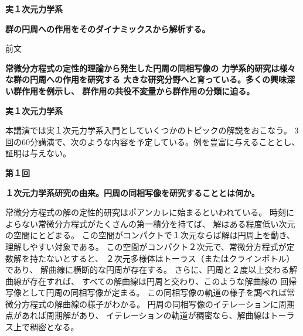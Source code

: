 \documentclass[uplatex,dvipdfmx]{jlreq}
\begin{document}
\begin{center}
  \vspace*{20pt}
  {\Huge\bfseries 実１次元力学系}

  \vspace{30pt}

  {\Large\bfseries 群の円周への作用をそのダイナミックスから解析する。}

  \vspace{50pt}

  {\large 前文}

  \vspace{10pt}

  \parbox{0.85\textwidth}{
    \large\bfseries
    常微分方程式の定性的理論から発生した円周の同相写像の
    力学系的研究は様々な群の円周への作用を研究する
    大きな研究分野へと育っている。多くの興味深い群作用を例示し、
    群作用の共役不変量から群作用の分類に迫る。
  }
\end{center}

\vfill

\newpage

\begin{center}
{\large\bfseries 実１次元力学系}

\hspace*{\fill}{\large\bfseries 坪井　俊（東大数理）}
\end{center}

\smallskip

本講演では実１次元力学系入門としていくつかのトピックの解説をおこなう。
3回の60分講演で、次のような内容を予定している。例を豊富に与えることとし、証明は与えない。

\bigskip
\noindent
{\large\textbf{第１回}}

\medskip
\noindent
\textbf{１次元力学系研究の由来。円周の同相写像を研究することとは何か。}

\medskip

常微分方程式の解の定性的研究はポアンカレに始まるといわれている。
時刻によらない常微分方程式がたくさんの第一積分を持てば、
解はある程度低い次元の空間にとどまる。
この空間がコンパクトで１次元ならば解は円周上を動き、理解しやすい対象である。
この空間がコンパクト２次元で、常微分方程式が定数解を持たないとすると、
２次元多様体はトーラス（またはクラインボトル）であり、
解曲線に横断的な円周が存在する。
さらに、円周と２度以上交わる解曲線が存在すれば、
すべての解曲線は円周と交わり、このような解曲線の
回帰写像として円周の同相写像が定まる。
この同相写像の軌道の様子を調べれば常微分方程式の解曲線の様子がわかる。
円周の同相写像のイテレーションに周期点があれば周期解があり、
イテレーションの軌道が稠密なら、解曲線はトーラス上で稠密となる。
\end{document}
